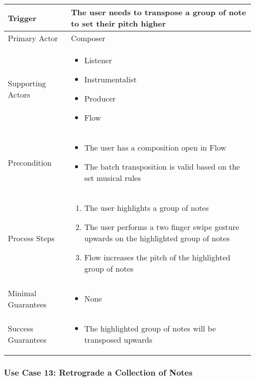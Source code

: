   \begin{tabularx}{\textwidth}{|X|X|}
  \hline
  Trigger & 
  The user needs to transpose a group of note to set their pitch higher \\
  \hline
  Primary Actor & 
  Composer \\
  \hline
  Supporting Actors & 
  \begin{itemize}
  \item Listener
  \item Instrumentalist
  \item Producer
  \item Flow
  \end{itemize} \\
  \hline
  Precondition & 
  \begin{itemize}
  \item The user has a composition open in Flow
  \item The batch transposition is valid based on the set musical rules
  \end{itemize} \\
  \hline
  Process Steps & 
  \begin{enumerate}
  \item The user highlights a group of notes
  \item The user performs a two finger swipe gesture upwards on the highlighted group of notes
  \item Flow increases the pitch of the highlighted group of notes
  \end{enumerate} \\
  \hline
  Minimal Guarantees & 
  \begin{itemize}
    \item None
  \end{itemize} \\
  \hline
  Success Guarantees & 
  \begin{itemize}
    \item The highlighted group of notes will be transposed upwards
  \end{itemize} \\
  \hline
  \end{tabularx}


  \subsubsection{Use Case 13: Retrograde a Collection of Notes}


